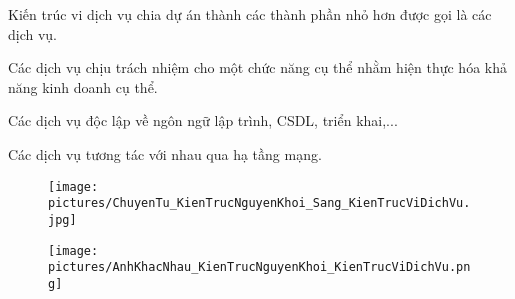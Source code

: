 

Kiến trúc vi dịch vụ chia dự án thành các thành phần nhỏ hơn được gọi là các dịch vụ.




Các dịch vụ   chịu trách nhiệm cho một chức năng cụ thể nhằm hiện thực hóa khả năng kinh doanh cụ thể.



Các dịch vụ   độc lập về ngôn ngữ lập trình, CSDL, triển khai,...



Các dịch vụ   tương tác với nhau qua hạ tầng mạng.



\begin{figure}[h]
    \centering
    \texttt{[image: pictures/ChuyenTu\_KienTrucNguyenKhoi\_Sang\_KienTrucViDichVu.jpg]}
\end{figure}



\begin{figure}[h]
    \centering
    \texttt{[image: pictures/AnhKhacNhau\_KienTrucNguyenKhoi\_KienTrucViDichVu.png]}
\end{figure}
